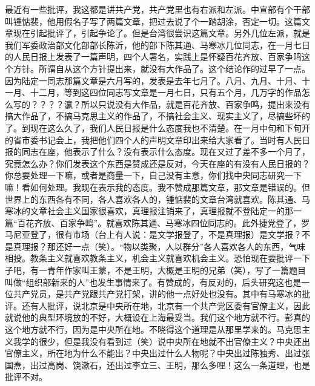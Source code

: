 最近有一些批评，我这都是讲共产党，共产党里也有右派和左派。中宣部有个干部叫锺惦裴，他用假名子写了两篇文章，把过去说了个一踏胡涂，否定一切。这篇文章现在引起批评了，引起争论了。但是台湾很尝识这篇文章。另外几位左派，就是我们军委政治部文化部部长陈沂，他的部下陈其通、马寒冰几位同志，在一月七日的人民日报上发表了一篇声明，四个人署名，实践上是怀疑百花齐放、百家争鸣这个方针。所谓自从这个方针提出来，就没有大作品了。这个结论作的过早了一点。因为陆定一同志那篇文章是六月写的，发表是去年七月了。八月、九月、十月、十一月、十二月，等到这四位同志写文章是一月七日，只有五个月，几万字的作品怎么写的？？？？瀛？所以只说没有大作品，就是百花齐放、百家争鸣，提出来没有搞大作品了，不搞马克思主义的作品了，不搞社会主义、现实主义了，尽搞些坏的了。到现在这么久了，我们人民日报是什么态度我也不清楚。在一月中旬和下旬开的省市委书记会上，我把他们四个人的声明文章印出来给大家看了。当时有人民日报的同志在座，他表示了什么？没有表示什么态度。现在又过了差不多一个月了，究竟怎么办？你们发表这个东西是赞成还是反对，今天在座的有没有人民日报的？你总要处理一下嘛，或者是商量一下，自己没有主意，你们找中央同志研究一下嘛！看如何处理。我现在表示我的态度。我不赞成那篇文章，那文章是错误的。但世界上的东西各有不同，各人喜欢各人的，锺惦裴的文章台湾就喜欢。陈其通、马寒冰的文章社会主义国家很喜欢，真理报注销来了，真理报就不登陆定一的那一篇“百花齐放、百家争鸣”。就喜欢陈其通、马寒冰四位同志的。此外捷党登了，罗马尼亚登了，很有市场（台上有人说：是文学报登了，不是真理报）是文学报？不是真理报？那还好一点（笑）。“物以类聚，人以群分”各人喜欢各人的东西，气味相投。教条主义就喜欢教条主义，机会主义就喜欢机会主义。恐怕现在要批评一下子吧，有一青年作家叫王蒙，不是王明，大概是王明的兄弟（笑），写了一篇题目叫做“组织部新来的人”也发生事情来了。有赞成的，有反对的，后头研究这也是一位共产党员，是共产党跟共产党打架，讲的他一点好处也没有。其中有马寒冰的批评。还有人批评，说北京是中央所在地，北京有一个共产党区委有官僚主义，因此就说他的典型环境放的不好，大概设在上海最妥当。我们这个地方就不行。彭真的这个地方就不行，因为是中央所在地。不晓得这个道理是从那里学来的。马克思主义我学的很少，但是我没有看到过（笑）说中央所在地就不出官僚主义？中央还出官僚主义，所在地为什么不能出？中央出过什么人物呢？中央出过陈独秀、出过张国焘，出过高岗、饶漱石，还出过李立三、王明，那么多哩！这么一条道理，也是批评不对。

